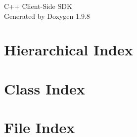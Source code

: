 \documentclass[twoside]{book}
\newcommand{\+}{\discretionary{\mbox{\scriptsize$\hookleftarrow$}}{}{}}
\newcommand{\clearemptydoublepage}{%
    \newpage{\pagestyle{empty}\cleardoublepage}%
  }
\begin{document}
  \raggedbottom
    \hypersetup{pageanchor=false,
                bookmarksnumbered=true,
                pdfencoding=unicode
               }
  \begin{titlepage}
  \vspace*{7cm}
  \begin{center}%
  {\Large C++ Client-\/\+Side SDK}\\
  \vspace*{1cm}
  {\large Generated by Doxygen 1.9.8}\\
  \end{center}
  \end{titlepage}
  \clearemptydoublepage
  \tableofcontents
  \clearemptydoublepage
  \hypersetup{pageanchor=true}

\chapter{Hierarchical Index}

\chapter{Class Index}

\chapter{File Index}

\end{document}
